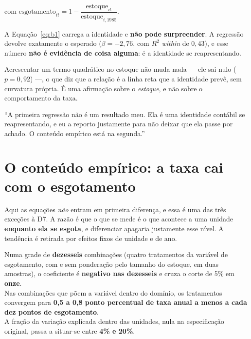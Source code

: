 com $\text{esgotamento}_{it} = 1 - \dfrac{\text{estoque}_{it}}{\text{estoque}_{i,1985}}$.

\vspace{6pt}
A Equação~\ref{eq:b1} carrega a identidade e \textbf{não pode surpreender}. A
regressão devolve exatamente o esperado ($\beta = +2{,}76$, com $R^2$
\emph{within} de $0{,}43$), e esse número \textbf{não é evidência de coisa
alguma}: é a identidade se reapresentando.

Acrescentar um termo quadrático no estoque não muda nada --- ele sai nulo
($p = 0{,}92$) ---, o que diz que a relação é a linha reta que a identidade
prevê, sem curvatura própria. É uma afirmação sobre o \emph{estoque}, e não
sobre o comportamento da taxa.

\begin{nabanca}
``A primeira regressão não é um resultado meu. Ela é uma identidade contábil se
reapresentando, e eu a reporto justamente para não deixar que ela passe por
achado. O conteúdo empírico está na segunda.''
\end{nabanca}

\section{O conteúdo empírico: a taxa cai com o esgotamento}

Aqui as equações \emph{não} entram em primeira diferença, e essa é uma das
três exceções à D7. A razão é que o que se mede é o que acontece a uma unidade
\textbf{enquanto ela se esgota}, e diferenciar apagaria justamente esse nível. A
tendência é retirada por efeitos fixos de unidade e de ano.

\begin{ancora}
Numa grade de \textbf{dezesseis} combinações (quatro tratamentos da variável de
esgotamento, com e sem ponderação pelo tamanho do estoque, em duas amostras), o
coeficiente é \textbf{negativo nas dezesseis} e cruza o corte de 5\% em
\textbf{onze}. \\[4pt]
Nas combinações que põem a variável dentro do domínio, os tratamentos convergem
para \textbf{0,5 a 0,8 ponto percentual de taxa anual a menos a cada dez pontos
de esgotamento}. \\[4pt]
A fração da variação explicada dentro das unidades, nula na especificação
original, passa a situar-se entre \textbf{4\% e 20\%}.
\end{ancora}

